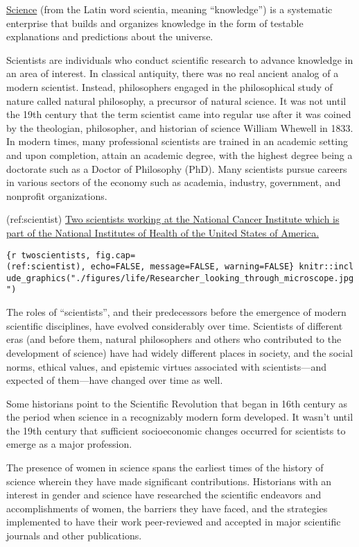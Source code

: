 \documentclass[
]{article}
\begin{document}
\href{https://en.wikipedia.org/wiki/Science}{Science} (from the Latin
word scientia, meaning ``knowledge'') is a systematic enterprise that
builds and organizes knowledge in the form of testable explanations and
predictions about the universe.

Scientists are individuals who conduct scientific research to advance
knowledge in an area of interest. In classical antiquity, there was no
real ancient analog of a modern scientist. Instead, philosophers engaged
in the philosophical study of nature called natural philosophy, a
precursor of natural science. It was not until the 19th century that the
term scientist came into regular use after it was coined by the
theologian, philosopher, and historian of science William Whewell in
1833. In modern times, many professional scientists are trained in an
academic setting and upon completion, attain an academic degree, with
the highest degree being a doctorate such as a Doctor of Philosophy
(PhD). Many scientists pursue careers in various sectors of the economy
such as academia, industry, government, and nonprofit organizations.

(ref:scientist)
\href{https://commons.wikimedia.org/wiki/File:Researcher_looking_through_microscope.jpg}{Two
scientists working at the National Cancer Institute which is part of the
National Institutes of Health of the United States of America.}

\texttt{\{r\ twoscientists,\ fig.cap=\textquotesingle{}(ref:scientist)\textquotesingle{},\ echo=FALSE,\ message=FALSE,\ warning=FALSE\}\ knitr::include\_graphics("./figures/life/Researcher\_looking\_through\_microscope.jpg")}

The roles of ``scientists'', and their predecessors before the emergence
of modern scientific disciplines, have evolved considerably over time.
Scientists of different eras (and before them, natural philosophers and
others who contributed to the development of science) have had widely
different places in society, and the social norms, ethical values, and
epistemic virtues associated with scientists---and expected of
them---have changed over time as well.

Some historians point to the Scientific Revolution that began in 16th
century as the period when science in a recognizably modern form
developed. It wasn't until the 19th century that sufficient
socioeconomic changes occurred for scientists to emerge as a major
profession.

The presence of women in science spans the earliest times of the history
of science wherein they have made significant contributions. Historians
with an interest in gender and science have researched the scientific
endeavors and accomplishments of women, the barriers they have faced,
and the strategies implemented to have their work peer-reviewed and
accepted in major scientific journals and other publications.
\end{document}
